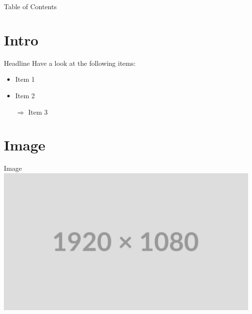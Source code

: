 
\begin{frame}{Table of Contents}
    \tableofcontents
\end{frame}


\section{Intro}

\begin{frame}{Headline}
    Have a look at the following items:

    \begin{itemize}
        \item Item 1
        \item Item 2
        \pause
        \item[$\Rightarrow$] Item 3~\cite{template}
    \end{itemize}
\end{frame}


\section{Image}

\begin{frame}{Image}
    \includegraphics[width=\textwidth]{assets/placeholder.png}
\end{frame}
